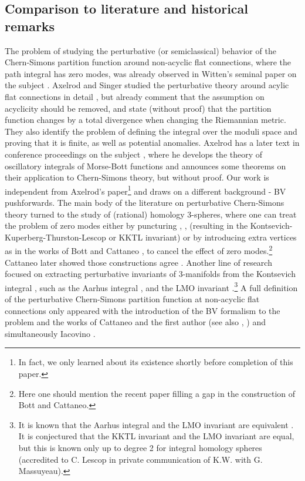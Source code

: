 \documentclass[11pt,a4paper]{amsart}
\theoremstyle{plain} %
\theoremstyle{definition}
\theoremstyle{remark}
\begin{document}
\subsection{Comparison to literature and historical remarks}
 The problem of studying the perturbative (or semiclassical) behavior of the Chern-Simons partition function around non-acyclic flat connections, where the path integral has zero modes, was already observed in Witten's seminal paper on the subject \cite[p.361]{Witten1989}. Axelrod and Singer studied the perturbative theory around acylic flat connections in detail \cite{Axelrod1991}, \cite{Axelrod1994} but already comment that the assumption on acyclicity should be removed, and state (without proof) that the partition function changes by a total divergence when changing the Riemannian metric. They also identify the problem of defining the integral over the moduli space and proving that it is finite, as well as potential anomalies. Axelrod has a later %
 text in conference proceedings %
 on the subject \cite{Axelrod1995}, where he develops the theory of oscillatory integrals of Morse-Bott functions and announces some theorems on their application to Chern-Simons theory, but without proof. Our work %
 is independent from %
 Axelrod's paper\footnote{In fact, we only learned about its existence shortly before completion of this paper.} and draws on a different background - BV pushforwards. 
The main body of the literature on perturbative Chern-Simons theory turned to the study of (rational) homology 3-spheres, where one can treat the problem of zero modes either by puncturing \cite{Kontsevich1993}, \cite{Kuperberg1999}, \cite{Lescop2002} (resulting in the Kontsevich-Kuperberg-Thurston-Lescop or KKTL invariant) or by introducing %
extra vertices as in the works of Bott and Cattaneo \cite{Bott1998}, \cite{Bott1999} to cancel the effect of zero modes.\footnote{Here one should mention the recent paper \cite{cattaneo2021note} filling a gap in the construction of Bott and Cattaneo.} Cattaneo later showed those constructions agree \cite{Cattaneo1999}. Another line of research focused on extracting perturbative invariants of 3-manifolds from the Kontsevich integral \cite{Kontsevich1993a}, such as the Aarhus integral \cite{Bar-Natan2002}, \cite{Bar-Natan2002a} and the LMO invariant \cite{Le1998}.\footnote{It is known that the Aarhus integral and the LMO invariant are equivalent \cite{Bar-Natan2004}. It is conjectured that the KKTL invariant and the LMO invariant are equal, but this is known only up to degree 2 for integral homology spheres (accredited to C. Lescop in private communication of K.W. with G. Massuyeau). }   A full definition of the perturbative Chern-Simons partition function at non-acyclic flat connections only appeared with the introduction of the BV formalism to the problem and the works of Cattaneo and the first author \cite{Cattaneo2008} (see also \cite{mnev2019quantum}, \cite{Wernli2022}) and simultaneously Iacovino \cite{Iacovino2008}. \\
\end{document}
